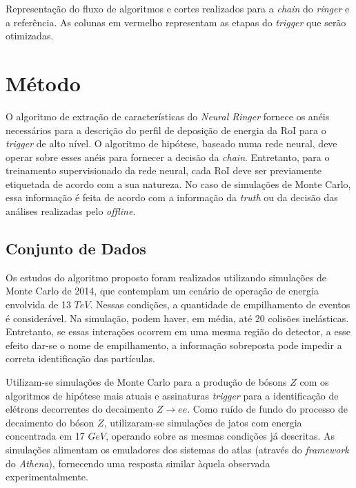 \begin{landscape}
\begin{table}[p]
\caption[Representação do fluxo de algoritmos e cortes realizados para a \textit{chain} do \textit{ringer} e a referência.]
{Representação do fluxo de algoritmos e cortes realizados para a \textit{chain} do \textit{ringer} e a referência. As colunas em vermelho representam as etapas do \textit{trigger} que serão otimizadas.}
\label{tab:chain_do_ringer}
\end{table}

\end{landscape}


\section{Método}

O algoritmo de extração de características do \textit{Neural Ringer} fornece os anéis necessários para a descrição do perfil de deposição de energia da RoI para o \textit{trigger} de alto nível.
O algoritmo de hipótese, baseado numa rede neural, deve operar sobre esses anéis para fornecer a decisão da \textit{chain}. Entretanto, para o treinamento supervisionado
da rede neural, cada RoI deve ser previamente etiquetada de acordo com a sua natureza. No caso de simulações de Monte Carlo, essa informação é feita de acordo 
com a informação da \textit{truth} ou da decisão das análises realizadas pelo \textit{offline}. 

\subsection{Conjunto de Dados}

Os estudos do algoritmo proposto foram realizados utilizando simulações de Monte Carlo de 2014, que contemplam um cenário de operação de energia
envolvida de 13 $TeV$. Nessas condições, a quantidade de empilhamento de eventos é considerável. Na simulação, podem haver, em média, até 20 colisões  
inelásticas. Entretanto, se essas interações ocorrem em uma mesma região do detector, a esse efeito dar-se o nome de empilhamento, a informação sobreposta 
pode impedir a correta identificação das partículas.

Utilizam-se simulações de Monte Carlo para a produção de bósons $Z$ com os algoritmos de hipótese mais atuais e assinaturas \textit{trigger} para a identificação
de elétrons decorrentes do decaimento $Z\rightarrow ee$. Como ruído de fundo do processo de decaimento do bóson $Z$, utilizaram-se simulações de jatos com energia
concentrada em 17 $GeV$, operando sobre as mesmas condições já descritas. As simulações alimentam os emuladores dos sistemas do \gls{atlas} (através do
\textit{framework} do \textit{Athena}), fornecendo uma resposta similar àquela observada experimentalmente.

